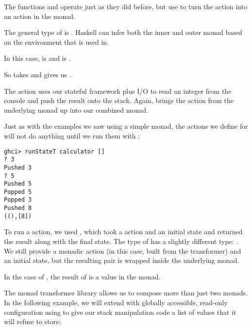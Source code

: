 

\begin{notelist}
    \item The functions  and  operate just as they did before, but use  to
          turn the  action  into an action in the  monad.
    \item The general type of  is . Haskell can infer both the inner and
          outer monad based on the environment that  is used in.
    \item In this case,  is  and  is .
    \item So  takes  and gives us .
    \item The  action uses our stateful framework plus I/O to read an integer from the console and
          push the result onto the stack. Again,  brings the  action from the underlying
           monad up into our combined monad.
\end{notelist}

Just as with the examples we saw using a simple  monad, the actions we define for 
will not do anything until we run them with :

\begin{lstlisting}
ghci> runStateT calculator []
? 3
Pushed 3
? 5
Pushed 5
Popped 5
Popped 3
Pushed 8
((),[8])
\end{lstlisting}

To run a  action, we used , which took a 
action and an initial state and returned the result along with the final state. The type of  has a
slightly different type: . We still provide a monadic action (in this case,
built from the  transformer) and an initial state, but the resulting pair is wrapped inside the
underlying monad.

In the case of , the result of  is a value in the  monad.

The monad transformer library allows us to compose more than just two monads. In the following example,
we will extend  with globally accessible, read-only configuration using 
to give our stack manipulation code a list of values that it will refuse to store:


